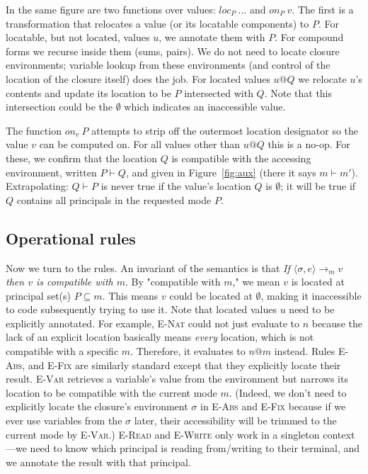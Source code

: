 \documentclass[10pt]{article}
\makeatletter
\newcommand{\rulelab}[1]{{\small \textsc{#1}}}
\newcommand{\kw}[1]{\ensuremath{\mathtt{#1}}}
\newcommand{\vloc}[2]{\ensuremath{{#1}\kw{@}{#2}}}
\newcommand{\eval}[4]{\ensuremath{\config{#1}{#3} \longrightarrow_{#2} {#4}}}
\newcommand{\env}{\ensuremath{\sigma}}
\newcommand{\config}[2]{\ensuremath{\langle{#1},{#2}\rangle}}
\newcommand{\locof}[2]{\ensuremath{\mathit{loc}_{#1}~{#2}}}
\newcommand{\getat}[2]{\ensuremath{\mathit{on}_{#1}~{#2}}}
\makeatother
\begin{document}
In the same figure are two functions over values: $\locof{P}{...}$ and
$\getat{P}{v}$. The first is a transformation that relocates a value
(or its locatable components) to $P$. For locatable, but not located, values $u$,
we annotate them with $P$. For compound forms we recurse inside them
(sums, pairs). We do not need to locate closure environments; variable
lookup from these environments (and control of the location of the
closure itself) does the job.  For located values $\vloc{u}{Q}$ we
relocate $u$'s contents and update its location to be $P$ intersected
with $Q$. Note that this intersection could be the $\emptyset$ which
indicates an inaccessible value.

The function $\getat{v}{P}$ attempts to strip off the outermost
location designator so the value $v$ can be computed on. For all
values other than $\vloc{u}{Q}$ this is a no-op. For these, we confirm
that the location $Q$ is compatible with the accessing environment,
written $P \vdash Q$, and given in Figure~\ref{fig:aux} (there it says
$m \vdash m'$). Extrapolating: $Q \vdash P$ is never true if the value's
location $Q$ is $\emptyset$; it will be true if $Q$ contains all
principals in the requested mode $P$.

\subsection{Operational rules}

Now we turn to the rules. An invariant of the semantics is that
\emph{If $\eval{\env}{m}{e}{v}$ then $v$ is compatible with $m$}. By
"compatible with $m$," we mean $v$ is located at principal set(s)
$P \subseteq m$. This means $v$ could be located at $\emptyset$,
making it inaccessible to code subsequently trying to use it. Note
that located values $u$ need to be explicitly annotated. For example,
\rulelab{E-Nat} could not just evaluate to $n$ because the lack of an
explicit location basically means \emph{every} location, which is not
compatible with a specific $m$. Therefore, it evaluates to
$\vloc{n}{m}$ instead. Rules \rulelab{E-Abs}, and \rulelab{E-Fix} are
similarly standard except that they explicitly locate their
result. \rulelab{E-Var} retrieves a variable's value from the
environment but narrows its location to be compatible with the current
mode $m$. (Indeed, we don't need to explicitly locate the closure's
environment $\env$ in \rulelab{E-Abs} and \rulelab{E-Fix} because if
we ever use variables from the $\env$ later, their accessibility will
be trimmed to the current mode by \rulelab{E-Var}.) \rulelab{E-Read}
and \rulelab{E-Write} only work in a singleton context---we need to
know which principal is reading from/writing to their terminal, and we
annotate the result with that principal.
\end{document}
